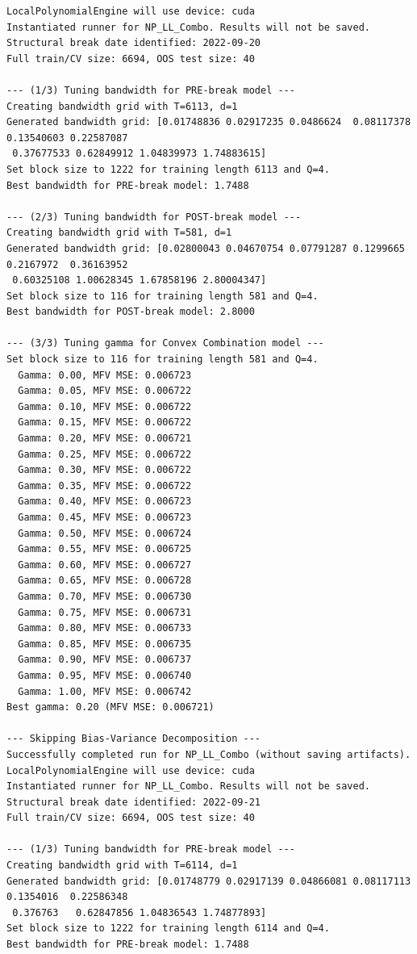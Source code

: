\documentclass[
  letterpaper,
  DIV=11,
  numbers=noendperiod]{scrartcl}
\begin{document}
\begin{verbatim}
LocalPolynomialEngine will use device: cuda
Instantiated runner for NP_LL_Combo. Results will not be saved.
Structural break date identified: 2022-09-20
Full train/CV size: 6694, OOS test size: 40

--- (1/3) Tuning bandwidth for PRE-break model ---
Creating bandwidth grid with T=6113, d=1
Generated bandwidth grid: [0.01748836 0.02917235 0.0486624  0.08117378 0.13540603 0.22587087
 0.37677533 0.62849912 1.04839973 1.74883615]
Set block size to 1222 for training length 6113 and Q=4.
Best bandwidth for PRE-break model: 1.7488

--- (2/3) Tuning bandwidth for POST-break model ---
Creating bandwidth grid with T=581, d=1
Generated bandwidth grid: [0.02800043 0.04670754 0.07791287 0.1299665  0.2167972  0.36163952
 0.60325108 1.00628345 1.67858196 2.80004347]
Set block size to 116 for training length 581 and Q=4.
Best bandwidth for POST-break model: 2.8000

--- (3/3) Tuning gamma for Convex Combination model ---
Set block size to 116 for training length 581 and Q=4.
  Gamma: 0.00, MFV MSE: 0.006723
  Gamma: 0.05, MFV MSE: 0.006722
  Gamma: 0.10, MFV MSE: 0.006722
  Gamma: 0.15, MFV MSE: 0.006722
  Gamma: 0.20, MFV MSE: 0.006721
  Gamma: 0.25, MFV MSE: 0.006722
  Gamma: 0.30, MFV MSE: 0.006722
  Gamma: 0.35, MFV MSE: 0.006722
  Gamma: 0.40, MFV MSE: 0.006723
  Gamma: 0.45, MFV MSE: 0.006723
  Gamma: 0.50, MFV MSE: 0.006724
  Gamma: 0.55, MFV MSE: 0.006725
  Gamma: 0.60, MFV MSE: 0.006727
  Gamma: 0.65, MFV MSE: 0.006728
  Gamma: 0.70, MFV MSE: 0.006730
  Gamma: 0.75, MFV MSE: 0.006731
  Gamma: 0.80, MFV MSE: 0.006733
  Gamma: 0.85, MFV MSE: 0.006735
  Gamma: 0.90, MFV MSE: 0.006737
  Gamma: 0.95, MFV MSE: 0.006740
  Gamma: 1.00, MFV MSE: 0.006742
Best gamma: 0.20 (MFV MSE: 0.006721)

--- Skipping Bias-Variance Decomposition ---
Successfully completed run for NP_LL_Combo (without saving artifacts).
LocalPolynomialEngine will use device: cuda
Instantiated runner for NP_LL_Combo. Results will not be saved.
Structural break date identified: 2022-09-21
Full train/CV size: 6694, OOS test size: 40

--- (1/3) Tuning bandwidth for PRE-break model ---
Creating bandwidth grid with T=6114, d=1
Generated bandwidth grid: [0.01748779 0.02917139 0.04866081 0.08117113 0.1354016  0.22586348
 0.376763   0.62847856 1.04836543 1.74877893]
Set block size to 1222 for training length 6114 and Q=4.
Best bandwidth for PRE-break model: 1.7488


\end{verbatim}
\end{document}
